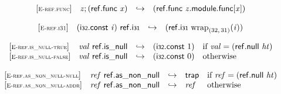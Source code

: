 \vspace{1ex}

$$
\begin{array}{@{}l@{}lcl@{}l@{}}
{[\textsc{\scriptsize E{-}ref.func}]} \quad & {\mathit{z}} ; (\mathsf{ref.func}~{\mathit{x}}) &\hookrightarrow& (\mathsf{ref.func}~{\mathit{z}}.\mathsf{module}.\mathsf{func}{}[{\mathit{x}}]) &  \\
\end{array}
$$

$$
\begin{array}{@{}l@{}lcl@{}l@{}}
{[\textsc{\scriptsize E{-}ref.i31}]} \quad & (\mathsf{i{\scriptstyle32}}.\mathsf{const}~{\mathit{i}})~\mathsf{ref.i{\scriptstyle31}} &\hookrightarrow& (\mathsf{ref.i{\scriptstyle31}}~{{{\mathrm{wrap}}}_{(32,\, 31)}}{({\mathit{i}})}) &  \\
\end{array}
$$

\vspace{1ex}

$$
\begin{array}{@{}l@{}lcl@{}l@{}}
{[\textsc{\scriptsize E{-}ref.is\_null{-}true}]} \quad & {\mathit{val}}~\mathsf{ref.is\_null} &\hookrightarrow& (\mathsf{i{\scriptstyle32}}.\mathsf{const}~1) &\quad
  \mbox{if}~{\mathit{val}} = (\mathsf{ref.null}~{\mathit{ht}}) \\
{[\textsc{\scriptsize E{-}ref.is\_null{-}false}]} \quad & {\mathit{val}}~\mathsf{ref.is\_null} &\hookrightarrow& (\mathsf{i{\scriptstyle32}}.\mathsf{const}~0) &\quad
  \mbox{otherwise} \\
\end{array}
$$

\vspace{1ex}

$$
\begin{array}{@{}l@{}lcl@{}l@{}}
{[\textsc{\scriptsize E{-}ref.as\_non\_null{-}null}]} \quad & {\mathit{ref}}~\mathsf{ref.as\_non\_null} &\hookrightarrow& \mathsf{trap} &\quad
  \mbox{if}~{\mathit{ref}} = (\mathsf{ref.null}~{\mathit{ht}}) \\
{[\textsc{\scriptsize E{-}ref.as\_non\_null{-}addr}]} \quad & {\mathit{ref}}~\mathsf{ref.as\_non\_null} &\hookrightarrow& {\mathit{ref}} &\quad
  \mbox{otherwise} \\
\end{array}
$$

\vspace{1ex}


